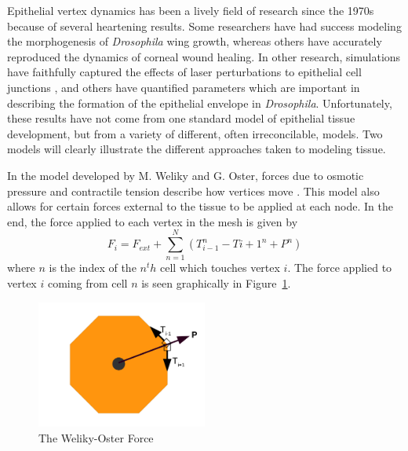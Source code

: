 Epithelial vertex dynamics has been a lively field of research since the 1970s because of several heartening results. Some researchers have had success modeling the morphogenesis of \emph{Drosophila} wing growth\cite{Farhadifar}, whereas others have accurately reproduced the dynamics of corneal wound healing\cite{WoundHealing}. In other research, simulations have faithfully captured the effects of laser perturbations to epithelial cell junctions \cite{Yoshi}, and others have quantified parameters which are important in describing the formation of the epithelial envelope in \emph{Drosophila}\cite{Sokolow}. Unfortunately, these results have not come from one standard model of epithelial tissue development, but from a variety of different, often irreconcilable, models. Two models will clearly illustrate the different approaches taken to modeling tissue. 

In the model developed by M. Weliky and G. Oster, forces due to osmotic pressure and contractile tension describe how vertices move \cite{WO}. This model also allows for certain forces external to the tissue to be applied at each node. In the end, the force applied to each vertex in the mesh is given by
\begin{equation*}
F_i = F_{ext}+\sum\limits_{n=1}^N(T_{i-1}^n - T{i+1}^n + P^n)
\end{equation*}
where $n$ is the index of the $n^th$ cell which touches vertex $i$. The force applied to vertex $i$ coming from cell $n$  is seen graphically in Figure~\ref{fig:WO}.
\begin{figure}[h]
\centering
\includegraphics[width=0.5\textwidth]{../diagrams/welikyoster.png}
\caption{The Weliky-Oster Force}
\label{fig:WO}
\end{figure}

